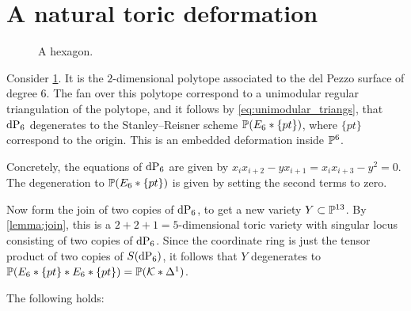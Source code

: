 \section{A natural toric deformation}

\begin{figure}[b]
\centering

\caption{A hexagon.}
\label{fig:hexagon}
\end{figure}

Consider \cref{fig:hexagon}. It is the $2$-dimensional polytope associated to the del Pezzo surface of degree $6$. The fan over this polytope correspond to a unimodular regular triangulation of the polytope, and it follows by \cref{eq:unimodular_triangs}, that $\dP6$ degenerates to the Stanley--Reisner scheme $\P(E_6 \ast \{pt\})$, where $\{ pt \}$ correspond to the origin. This is an embedded deformation inside $\P^6$.

Concretely, the equations of $\dP6$ are given by $x_ix_{i+2}-yx_{i+1}=x_ix_{i+3}-y^2=0$. The degeneration to $\P(E_6 \ast \{ pt \})$ is given by setting the second terms to zero.

Now form the join of two copies of $\dP6$, to get a new variety $Y \subset \P^{13}$. By \cref{lemma:join}, this is a $2+2+1=5$-dimensional toric variety with singular locus consisting of two copies of $\dP6$. Since the coordinate ring is just the tensor product of two copies of $S(\dP6)$, it follows that $Y$ degenerates to $\P(E_6 \ast \{pt\} \ast E_6 \ast \{ pt \})=\P(\K \ast \Delta^1)$.

The following holds:

